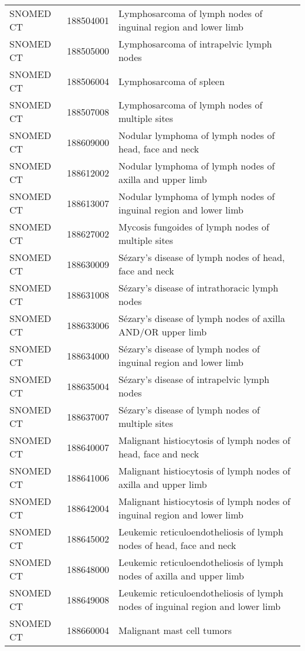 \begin{longtable}{p{}p{}p{}}
  SNOMED CT & 188504001 & Lymphosarcoma of lymph nodes of inguinal region and lower limb \\ 
  SNOMED CT & 188505000 & Lymphosarcoma of intrapelvic lymph nodes \\ 
  SNOMED CT & 188506004 & Lymphosarcoma of spleen \\ 
  SNOMED CT & 188507008 & Lymphosarcoma of lymph nodes of multiple sites \\ 
  SNOMED CT & 188609000 & Nodular lymphoma of lymph nodes of head, face and neck \\ 
  SNOMED CT & 188612002 & Nodular lymphoma of lymph nodes of axilla and upper limb \\ 
  SNOMED CT & 188613007 & Nodular lymphoma of lymph nodes of inguinal region and lower limb \\ 
  SNOMED CT & 188627002 & Mycosis fungoides of lymph nodes of multiple sites \\ 
  SNOMED CT & 188630009 & Sézary's disease of lymph nodes of head, face and neck \\ 
  SNOMED CT & 188631008 & Sézary's disease of intrathoracic lymph nodes \\ 
  SNOMED CT & 188633006 & Sézary's disease of lymph nodes of axilla AND/OR upper limb \\ 
  SNOMED CT & 188634000 & Sézary's disease of lymph nodes of inguinal region and lower limb \\ 
  SNOMED CT & 188635004 & Sézary's disease of intrapelvic lymph nodes \\ 
  SNOMED CT & 188637007 & Sézary's disease of lymph nodes of multiple sites \\ 
  SNOMED CT & 188640007 & Malignant histiocytosis of lymph nodes of head, face and neck \\ 
  SNOMED CT & 188641006 & Malignant histiocytosis of lymph nodes of axilla and upper limb \\ 
  SNOMED CT & 188642004 & Malignant histiocytosis of lymph nodes of inguinal region and lower limb \\ 
  SNOMED CT & 188645002 & Leukemic reticuloendotheliosis of lymph nodes of head, face and neck \\ 
  SNOMED CT & 188648000 & Leukemic reticuloendotheliosis of lymph nodes of axilla and upper limb \\ 
  SNOMED CT & 188649008 & Leukemic reticuloendotheliosis of lymph nodes of inguinal region and lower limb \\ 
  SNOMED CT & 188660004 & Malignant mast cell tumors \\ 

\end{longtable}
